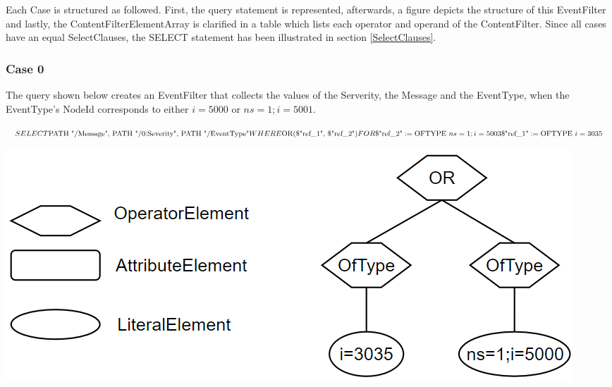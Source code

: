 \documentclass[10pt]{scrreprt}
\begin{document}
Each Case is structured as followed. First, the query statement is represented, afterwards, a figure depicts the structure of this EventFilter and lastly, the ContentFilterElementArray is clarified in a table which lists each operator and operand of the ContentFilter.
Since all cases have an equal SelectClauses, the SELECT statement has been illustrated in section \ref{SelectClauses}.


\subsubsection*{Case 0}
The query shown below creates an EventFilter that collects the values of the Serverity, the Message and the EventType, when the EventType's NodeId corresponds to either $i=5000$ or $ns=1;i=5001$.
\begin{addmargin}[125pt]{0pt}
    $
    SELECT \newline
    \text{PATH "/Message", PATH "/0:Severity", PATH "/EventType"} \newline
    WHERE \newline
    \text{OR(\$"ref\_1", \$"ref\_2")} \newline
    FOR \newline
    \text{\$"ref\_2"}:= \text{OFTYPE } ns=1;i=5003 \newline
    \text{\$"ref\_1"}:= \text{OFTYPE } i=3035 \newline
    $
\end{addmargin}

\includegraphics[width=\textwidth]{case_0.png}

\begin{table}[h]
    \centering
    \caption{\textbf{Case 0}}
    \label{tab:my-table}
\end{table}
\end{document}
